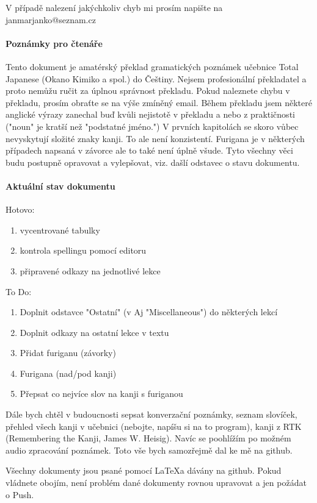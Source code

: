 V případě nalezení jakýchkoliv chyb mi prosím napište na janmarjanko@seznam.cz

\paragraph{Poznámky pro čtenáře}
Tento dokument je amatérský překlad gramatických poznámek učebnice Total Japanese (Okano Kimiko a spol.) do Češtiny. Nejsem profesionální překladatel a proto nemůžu ručit za úplnou správnost překladu. Pokud naleznete chybu v překladu, prosím obraťte se na výše zmíněný email. Během překladu jsem některé anglické výrazy zanechal buď kvůli nejistotě v překladu a nebo z praktičnosti ("noun" je kratší než "podstatné jméno.") V prvních kapitolách se skoro vůbec nevyskytují složité  znaky kanji. To ale není konzistentí. Furigana je v některých případech napsaná v závorce ale to také není úplně všude. Tyto všechny věci budu postupně opravovat a vylepšovat, viz. dašlí odstavec o stavu dokumentu.

\paragraph{Aktuální stav dokumentu}

Hotovo:
\begin{enumerate}
\item vycentrované tabulky
\item kontrola spellingu pomocí editoru
\item připravené odkazy na jednotlivé lekce
\end{enumerate}

To Do:
\begin{enumerate}
\item Doplnit odstavce "Ostatní" (v Aj "Miscellaneous") do některých lekcí
\item Doplnit odkazy na ostatní lekce v textu
\item Přidat furiganu (závorky)
\item Furigana (nad/pod kanji)
\item Přepsat co nejvíce slov na kanji s furiganou
\end{enumerate}

Dále bych chtěl v budoucnosti sepsat konverzační poznámky, seznam slovíček, přehled všech kanji v učebnici (nebojte, napíšu si na to program), kanji z RTK (Remembering the Kanji, James W. Heisig). Navíc se poohlížím po možném audio zpracování poznámek. Toto vše bych samozřejmě dal ke mě na github.

Všechny dokumenty jsou psané pomocí \LaTeX  a dávány na github. Pokud vládnete obojím, není problém dané dokumenty rovnou upravovat a jen požádat o Push. 